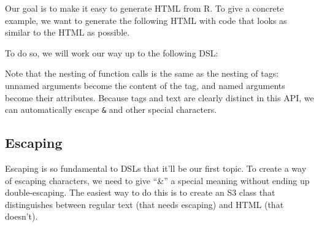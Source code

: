 Our goal is to make it easy to generate HTML from R. To give a concrete
example, we want to generate the following HTML with code that looks as
similar to the HTML as possible.

\begin{Shaded}
\begin{Highlighting}[]
  \KeywordTok{>}
   
   \KeywordTok{/>}
\end{Highlighting}
\end{Shaded}

To do so, we will work our way up to the following DSL:

\begin{Shaded}
\begin{Highlighting}[]
\NormalTok{(}\NormalTok{(}
  \NormalTok{(}\NormalTok{, } \NormalTok{),}
  \NormalTok{(}\NormalTok{, }\NormalTok{(}\NormalTok{)),}
  \NormalTok{(} \NormalTok{, } \NormalTok{, } \NormalTok{)}
\NormalTok{))}
\end{Highlighting}
\end{Shaded}

Note that the nesting of function calls is the same as the nesting of
tags: unnamed arguments become the content of the tag, and named
arguments become their attributes. Because tags and text are clearly
distinct in this API, we can automatically escape \texttt{\&} and other
special characters.

\subsection{Escaping}

Escaping is so fundamental to DSLs that it'll be our first topic. To
create a way of escaping characters, we need to give ``\&'' a special
meaning without ending up double-escaping. The easiest way to do this is
to create an S3 class that distinguishes between regular text (that
needs escaping) and HTML (that doesn't). 

